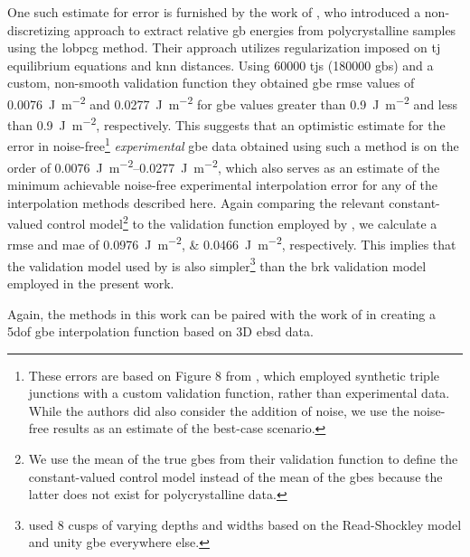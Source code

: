 \documentclass[final,twocolumn,12pt]{elsarticle}
\begin{document}
One such estimate for error is furnished by the work of \citet{shenDeterminingGrainBoundary2019}, who introduced a non-discretizing approach to extract relative \gls{gb} energies from polycrystalline samples using the \gls{lobpcg} method. Their approach utilizes regularization imposed on \gls{tj} equilibrium equations and \gls{knn} distances. Using \num{60000} \glspl{tj} (\num{180000} \glspl{gb}) and a custom, non-smooth validation function they obtained \gls{gbe} \gls{rmse} values of \SI{0.0076}{\J\per\square\meter} and \SI{0.0277}{\J\per\square\meter} for \gls{gbe} values greater than \SI{0.9}{\J\per\square\meter} and less than \SI{0.9}{\J\per\square\meter}, respectively. This suggests that an optimistic estimate for the error in noise-free\footnote{These errors are based on Figure 8 from \citet{shenDeterminingGrainBoundary2019}, which employed synthetic triple junctions with a custom validation function, rather than experimental data. While the authors did also consider the addition of noise, we use the noise-free results as an estimate of the best-case scenario.} \emph{experimental} \gls{gbe} data obtained using such a method is on the order of \SIrange{0.0076}{0.0277}{\J\per\square\meter}, which also serves as an estimate of the minimum achievable noise-free experimental interpolation error for any of the interpolation methods described here. %
%
Again comparing the relevant constant-valued control model\footnote{We use the mean of the true \glspl{gbe} from their validation function to define the constant-valued control model instead of the mean of the \inpt{} \glspl{gbe} because the latter does not exist for polycrystalline data.} to the validation function employed by \citet{shenDeterminingGrainBoundary2019}, we calculate a \gls{rmse} and \gls{mae} of \SIlist{0.0976;0.0466}{\joule\per\square\meter}, respectively. This implies that the validation model used by \citet{shenDeterminingGrainBoundary2019} is also simpler\footnote{\citet{shenDeterminingGrainBoundary2019} used 8 cusps of varying depths and widths based on the Read-Shockley model and unity \gls{gbe} everywhere else.} than the \gls{brk} validation model employed in the present work.

Again, the methods in this work can be paired with the work of \citet{shenDeterminingGrainBoundary2019} in creating a \gls{5dof} \gls{gbe} interpolation function based on 3D \gls{ebsd} data.
\end{document}
